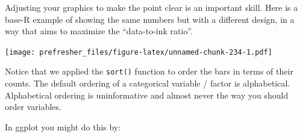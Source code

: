 \documentclass[]{book}
\newenvironment{Shaded}{\begin{snugshade}}{\end{snugshade}}
\newcommand{\KeywordTok}[1]{\textcolor[rgb]{0.13,0.29,0.53}{\textbf{#1}}}
\newcommand{\DataTypeTok}[1]{\textcolor[rgb]{0.13,0.29,0.53}{#1}}
\newcommand{\DecValTok}[1]{\textcolor[rgb]{0.00,0.00,0.81}{#1}}
\newcommand{\StringTok}[1]{\textcolor[rgb]{0.31,0.60,0.02}{#1}}
\newcommand{\CommentTok}[1]{\textcolor[rgb]{0.56,0.35,0.01}{\textit{#1}}}
\newcommand{\OtherTok}[1]{\textcolor[rgb]{0.56,0.35,0.01}{#1}}
\newcommand{\OperatorTok}[1]{\textcolor[rgb]{0.81,0.36,0.00}{\textbf{#1}}}
\newcommand{\NormalTok}[1]{#1}
\theoremstyle{definition}
\theoremstyle{definition}
\theoremstyle{definition}
\theoremstyle{remark}
\begin{document}
Adjusting your graphics to make the point clear is an important skill.
Here is a base-R example of showing the same numbers but with a
different design, in a way that aims to maximize the ``data-to-ink
ratio''.

\begin{Shaded}
\end{Shaded}

\texttt{[image: prefresher\_files/figure-latex/unnamed-chunk-234-1.pdf]}

Notice that we applied the \texttt{sort()} function to order the bars in
terms of their counts. The default ordering of a categorical variable /
factor is alphabetical. Alphabetical ordering is uninformative and
almost never the way you should order variables.

In ggplot you might do this by:

\begin{Shaded}
\end{Shaded}
\end{document}
